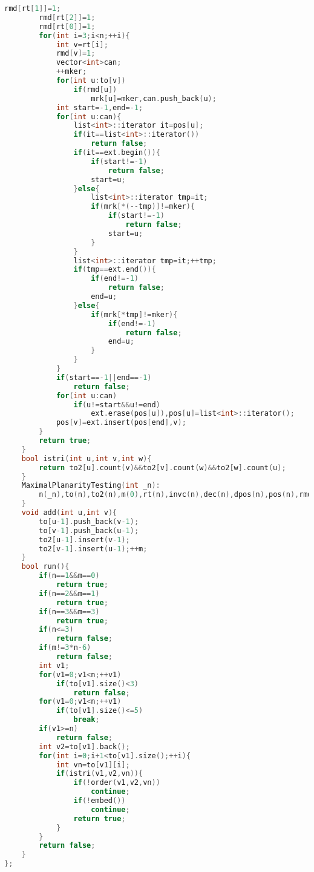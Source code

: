 \documentclass{book}
\begin{document}
\begin{lstlisting}[language=C++,title={Maximal Planarity Test.hpp (5195 bytes, 165 lines)}]
        rmd[rt[1]]=1;
        rmd[rt[2]]=1;
        rmd[rt[0]]=1;
        for(int i=3;i<n;++i){
            int v=rt[i];
            rmd[v]=1;
            vector<int>can;
            ++mker;
            for(int u:to[v])
                if(rmd[u])
                    mrk[u]=mker,can.push_back(u);
            int start=-1,end=-1;
            for(int u:can){
                list<int>::iterator it=pos[u];
                if(it==list<int>::iterator())
                    return false;
                if(it==ext.begin()){
                    if(start!=-1)
                        return false;
                    start=u;
                }else{
                    list<int>::iterator tmp=it;
                    if(mrk[*(--tmp)]!=mker){
                        if(start!=-1)
                            return false;
                        start=u;
                    }
                }
                list<int>::iterator tmp=it;++tmp;
                if(tmp==ext.end()){
                    if(end!=-1)
                        return false;
                    end=u;
                }else{
                    if(mrk[*tmp]!=mker){
                        if(end!=-1)
                            return false;
                        end=u;
                    }
                }
            }
            if(start==-1||end==-1)
                return false;
            for(int u:can)
                if(u!=start&&u!=end)
                    ext.erase(pos[u]),pos[u]=list<int>::iterator();
            pos[v]=ext.insert(pos[end],v);
        }
        return true;
    }
    bool istri(int u,int v,int w){
        return to2[u].count(v)&&to2[v].count(w)&&to2[w].count(u);
    }
    MaximalPlanarityTesting(int _n):
        n(_n),to(n),to2(n),m(0),rt(n),invc(n),dec(n),dpos(n),pos(n),rmd(n),mrk(n){
    }
    void add(int u,int v){
        to[u-1].push_back(v-1);
        to[v-1].push_back(u-1);
        to2[u-1].insert(v-1);
        to2[v-1].insert(u-1);++m;
    }
    bool run(){
        if(n==1&&m==0)
            return true;
        if(n==2&&m==1)
            return true;
        if(n==3&&m==3)
            return true;
        if(n<=3)
            return false;
        if(m!=3*n-6)
            return false;
        int v1;
        for(v1=0;v1<n;++v1)
            if(to[v1].size()<3)
                return false;
        for(v1=0;v1<n;++v1)
            if(to[v1].size()<=5)
                break;
        if(v1>=n)
            return false;
        int v2=to[v1].back();
        for(int i=0;i+1<to[v1].size();++i){
            int vn=to[v1][i];
            if(istri(v1,v2,vn)){
                if(!order(v1,v2,vn))
                    continue;
                if(!embed())
                    continue;
                return true;
            }
        }
        return false;
    }
};
\end{lstlisting}
\end{document}
